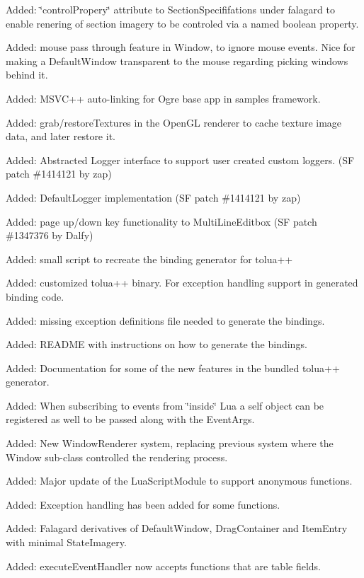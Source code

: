 \begin{DoxyItemize}
\item Added\+: \char`\"{}control\+Propery\char`\"{} attribute to Section\+Specififations under falagard to enable renering of section imagery to be controled via a named boolean property.
\item Added\+: mouse pass through feature in Window, to ignore mouse events. Nice for making a Default\+Window transparent to the mouse regarding picking windows behind it.
\item Added\+: M\+S\+V\+C++ auto-\/linking for Ogre base app in samples framework.
\item Added\+: grab/restore\+Textures in the Open\+GL renderer to cache texture image data, and later restore it.
\item Added\+: Abstracted Logger interface to support user created custom loggers. (SF patch \#1414121 by zap)
\item Added\+: Default\+Logger implementation (SF patch \#1414121 by zap)
\item Added\+: page up/down key functionality to Multi\+Line\+Editbox (SF patch \#1347376 by Dalfy)
\item Added\+: small script to recreate the binding generator for tolua++
\item Added\+: customized tolua++ binary. For exception handling support in generated binding code.
\item Added\+: missing exception definitions file needed to generate the bindings.
\item Added\+: R\+E\+A\+D\+ME with instructions on how to generate the bindings.
\item Added\+: Documentation for some of the new features in the bundled tolua++ generator.
\item Added\+: When subscribing to events from \char`\"{}inside\char`\"{} Lua a self object can be registered as well to be passed along with the Event\+Args.
\item Added\+: New Window\+Renderer system, replacing previous system where the Window sub-\/class controlled the rendering process.
\item Added\+: Major update of the Lua\+Script\+Module to support anonymous functions.
\item Added\+: Exception handling has been added for some functions.
\item Added\+: Falagard derivatives of Default\+Window, Drag\+Container and Item\+Entry with minimal State\+Imagery.
\item Added\+: execute\+Event\+Handler now accepts functions that are table fields.

\end{DoxyItemize}
